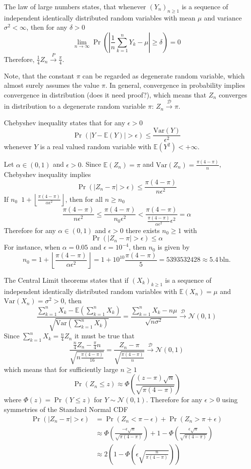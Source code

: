 \documentclass[a4paper]{article}
\newcommand{\brac}[1]{\left ( #1 \right )}
\newcommand{\abs}[1]{\left | #1 \right |}
\newcommand{\floor}[1]{\left\lfloor #1 \right\rfloor}
\newcommand{\Ex}[1]{\mathbb{E}\brac{#1}}
\newcommand{\Var}[1]{\text{Var}\brac{#1}}
\newcommand{\defn}{\mathop{\overset{\Delta}{=}}\nolimits}
\begin{document}
The law of large numbers states, that whenever $\brac{Y_n}_{n\geq1}$ is a sequence of independent identically distributed random variables with mean $\mu$ and variance $\sigma^2<\infty$, then for any $\delta>0$ \[\lim_{n\to \infty} \Pr\brac{\abs{\frac{1}{n}\sum_{k=1}^n Y_k-\mu}\geq \delta}=0\] Therefore, $\frac{1}{4}Z_n\overset{P}{\to} \frac{\pi}{4}$.

Note, that the constant $\pi$ can be regarded as degenerate random variable, which almost surely assumes the value $\pi$. In general, convergence in probability implies convergence in distribution (does it need proof?), which means that $Z_n$ converges in distribution to a degenerate random variable $\pi$: $Z_n\overset{\mathcal{D}}{\to}\pi$.

Chebyshev inequality states that for any $\epsilon>0$\[\Pr\brac{\abs{Y-\Ex{Y}} > \epsilon}\leq \frac{\Var{Y}}{\epsilon^2}\] whenever $Y$ is a real valued random variable with $\Ex{Y^2}<+\infty$.

Let $\alpha\in\brac{0,1}$ and $\epsilon>0$. Since $\Ex{Z_n}=\pi$ and $\Var{Z_n}=\frac{\pi\brac{4-\pi}}{n}$, Chebyshev inequality implies \[\Pr\brac{\abs{Z_n-\pi} > \epsilon}\leq \frac{\pi\brac{4-\pi}}{n \epsilon^2}\] If $n_0\defn 1+\floor{ \frac{\pi\brac{4-\pi}}{\alpha \epsilon^2} }$, then for all $n\geq n_0$ \[\frac{\pi\brac{4-\pi}}{n \epsilon^2} \leq \frac{\pi\brac{4-\pi}}{n_0 \epsilon^2}<\frac{\pi\brac{4-\pi}}{ \frac{\pi\brac{4-\pi}}{\alpha \epsilon^2} \epsilon^2} = \alpha\] Therefore for any $\alpha\in\brac{0,1}$ and $\epsilon>0$ there exists $n_0\geq1$ with \[\Pr\brac{\abs{Z_n-\pi} > \epsilon}\leq \alpha\] For instance, when $\alpha=0.05$ and $\epsilon=10^{-4}$, then $n_0$ is given by \[n_0=1+\floor{ \frac{\pi\brac{4-\pi}}{\alpha \epsilon^2} } = 1+10^{10} \frac{\pi\brac{4-\pi}}{5} = 5393532428 \approx 5.4\,\text{bln.}\]

The Central Limit theorems states that if $\brac{X_k}_{k\geq1}$ is a sequence of independent identically distributed random variables with $\Ex{X_n}=\mu$ and $\Var{X_n} = \sigma^2>0$, then \[\frac{\sum_{k=1}^n X_k - \Ex{\sum_{k=1}^n X_k}}{\sqrt{\Var{\sum_{k=1}^n X_k}}} = \frac{ \sum_{k=1}^n X_k - n \mu}{\sqrt{n\sigma^2}} \overset{\mathcal{D}}{\to} \mathcal{N}\brac{0,1}\] Since $\sum_{k=1}^n X_k = \frac{n}{4} Z_n$ it must be true that \[\frac{ \frac{n}{4} Z_n - \frac{\pi}{4} n }{ \sqrt{ n \frac{\pi\brac{4-\pi}}{16} } } = \frac{Z_n - \pi}{ \sqrt{\frac{\pi\brac{4-\pi}}{n}} } \overset{\mathcal{D}}{\to} \mathcal{N}\brac{0,1} \] which means that for sufficiently large $n\geq1$ \[\Pr\brac{Z_n\leq z}\approx \Phi\brac{ \frac{\brac{z-\pi}\sqrt{n}}{ \sqrt{\pi\brac{4-\pi}} } }\] where $\Phi\brac{z} = \Pr\brac{Y\leq z}$ for $Y\sim\mathcal{N}\brac{0,1}$. Therefore for any $\epsilon>0$ using symmetries of the Standard Normal CDF \begin{align*}
	\Pr\brac{\abs{Z_n-\pi}>\epsilon} &=\Pr\brac{Z_n<\pi-\epsilon}+\Pr\brac{Z_n>\pi+\epsilon}\\ &\approx \Phi\brac{ \frac{-\epsilon \sqrt{n}}{\sqrt{\pi\brac{4-\pi}}}} + 1-\Phi\brac{ \frac{\epsilon \sqrt{n}}{\sqrt{\pi\brac{4-\pi}}}}\\&\approx 2\brac{ 1 - \Phi\brac{ \epsilon\sqrt{\frac{n}{\pi\brac{4-\pi}}} }}
\end{align*}
\end{document}
